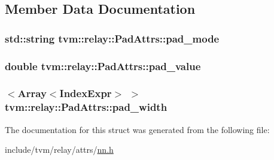 \subsection{Member Data Documentation}
\subsubsection[{\texorpdfstring{pad\+\_\+mode}{pad_mode}}]{\setlength{\rightskip}{0pt plus 5cm}std\+::string tvm\+::relay\+::\+Pad\+Attrs\+::pad\+\_\+mode}\hypertarget{structtvm_1_1relay_1_1PadAttrs_a235a1e3e6579dbee4962ff9e7954fed0}{}\label{structtvm_1_1relay_1_1PadAttrs_a235a1e3e6579dbee4962ff9e7954fed0}
\subsubsection[{\texorpdfstring{pad\+\_\+value}{pad_value}}]{\setlength{\rightskip}{0pt plus 5cm}double tvm\+::relay\+::\+Pad\+Attrs\+::pad\+\_\+value}\hypertarget{structtvm_1_1relay_1_1PadAttrs_a46eff5107fcb961943db94ca8ef1dc37}{}\label{structtvm_1_1relay_1_1PadAttrs_a46eff5107fcb961943db94ca8ef1dc37}
\subsubsection[{\texorpdfstring{pad\+\_\+width}{pad_width}}]{$<${\bf Array}$<${\bf Index\+Expr}$>$ $>$ tvm\+::relay\+::\+Pad\+Attrs\+::pad\+\_\+width}\hypertarget{structtvm_1_1relay_1_1PadAttrs_a3841e56dd6a9048ee9e6520b9253ee79}{}\label{structtvm_1_1relay_1_1PadAttrs_a3841e56dd6a9048ee9e6520b9253ee79}


The documentation for this struct was generated from the following file\+:\begin{DoxyCompactItemize}
\item 
include/tvm/relay/attrs/\hyperlink{include_2tvm_2relay_2attrs_2nn_8h}{nn.\+h}\end{DoxyCompactItemize}
